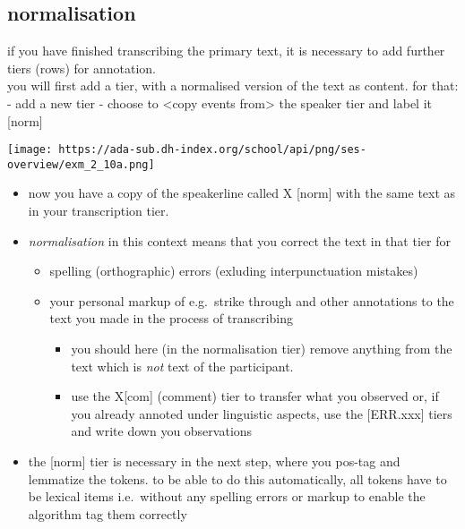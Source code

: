 \documentclass[
  12pt,
]{article}
\providecommand{\tightlist}{%
  \setlength{\itemsep}{0pt}\setlength{\parskip}{0pt}}
\begin{document}
\hypertarget{normalisation}{%
\subsection{normalisation}\label{normalisation}}

if you have finished transcribing the primary text, it is necessary to
add further tiers (rows) for annotation.\\
you will first add a tier, with a normalised version of the text as
content. for that: - add a new tier - choose to \textless copy events
from\textgreater{} the speaker tier and label it {[}norm{]}

\texttt{[image: https://ada-sub.dh-index.org/school/api/png/ses-overview/exm\_2\_10a.png]}

\begin{itemize}
\tightlist
\item
  now you have a copy of the speakerline called X {[}norm{]} with the
  same text as in your transcription tier.
\item
  \emph{normalisation} in this context means that you correct the text
  in that tier for

  \begin{itemize}
  \tightlist
  \item
    spelling (orthographic) errors (exluding interpunctuation mistakes)
  \item
    your personal markup of e.g.~strike through and other annotations to
    the text you made in the process of transcribing

    \begin{itemize}
    \tightlist
    \item
      you should here (in the normalisation tier) remove anything from
      the text which is \emph{not} text of the participant.
    \item
      use the X{[}com{]} (comment) tier to transfer what you observed
      or, if you already annoted under linguistic aspects, use the
      {[}ERR.xxx{]} tiers and write down you observations
    \end{itemize}
  \end{itemize}
\item
  the {[}norm{]} tier is necessary in the next step, where you pos-tag
  and lemmatize the tokens. to be able to do this automatically, all
  tokens have to be lexical items i.e.~without any spelling errors or
  markup to enable the algorithm tag them correctly
\end{itemize}
\end{document}
